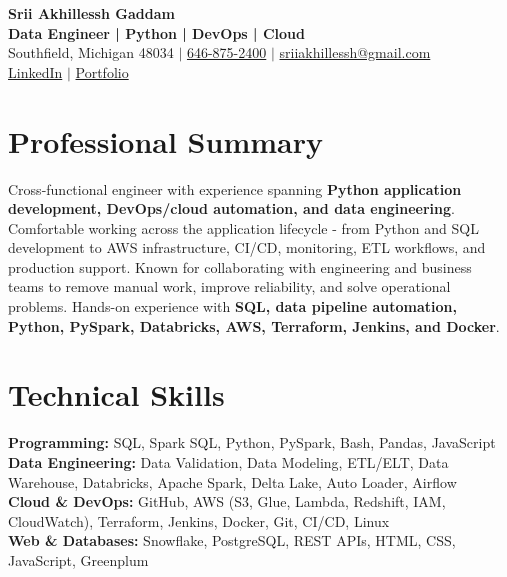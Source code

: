 \documentclass[letterpaper,10pt]{article}
\begin{document}
\fontsize{9.35pt}{10.45pt}\selectfont

\begin{center}
    {\LARGE \textbf{Srii Akhillessh Gaddam}} \\[-1pt]
    \textbf{Data Engineer | Python | DevOps | Cloud} \\[2pt]
    Southfield, Michigan 48034 $|$
    \href{tel:6468752400}{646-875-2400} $|$
    \href{mailto:sriiakhillessh@gmail.com}{sriiakhillessh@gmail.com} \\[1pt]
    \href{https://www.linkedin.com/in/srii-akhiilessh-gaddam-b48668191/}{LinkedIn} $|$
    \href{https://sriiakhillesshg.github.io/portfolio/}{Portfolio}
\end{center}
\vspace{-8pt}

\section{Professional Summary}
\small{Cross-functional engineer with experience spanning \textbf{Python application development, DevOps/cloud automation, and data engineering}. Comfortable working across the application lifecycle - from Python and SQL development to AWS infrastructure, CI/CD, monitoring, ETL workflows, and production support. Known for collaborating with engineering and business teams to remove manual work, improve reliability, and solve operational problems. Hands-on experience with \textbf{SQL, data pipeline automation, Python, PySpark, Databricks, AWS, Terraform, Jenkins, and Docker}.}

\section{Technical Skills}
\small{
\textbf{Programming:} SQL, Spark SQL, Python, PySpark, Bash, Pandas, JavaScript \\
\textbf{Data Engineering:} Data Validation, Data Modeling, ETL/ELT, Data Warehouse, Databricks, Apache Spark, Delta Lake, Auto Loader, Airflow \\
\textbf{Cloud \& DevOps:} GitHub, AWS (S3, Glue, Lambda, Redshift, IAM, CloudWatch), Terraform, Jenkins, Docker, Git, CI/CD, Linux \\
\textbf{Web \& Databases:} Snowflake, PostgreSQL, REST APIs, HTML, CSS, JavaScript, Greenplum
}
\end{document}
